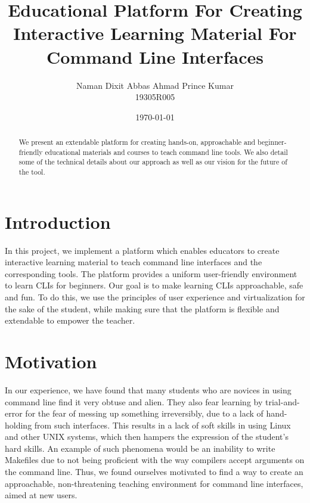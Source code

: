 \documentclass[a4paper]{article}
\begin{document}
\title{\textbf{\huge{Educational Platform For Creating Interactive Learning Material For Command Line Interfaces}}}
\author{\textbf\large{Naman Dixit \quad Abbas Ahmad \quad Prince Kumar \\ 19305R005 \quad\quad{} \quad{}}}
\date{\today}

\maketitle
\begin{abstract}
We present an extendable platform for creating hands-on, approachable and beginner-friendly  educational materials and courses to teach command line tools. We also detail some of the technical details about our approach as well as our vision for the future of the tool.

\end{abstract}
\maketitle

\section{Introduction}

In this project, we implement a platform which enables educators to create interactive learning material to teach command line interfaces and the corresponding tools. The platform provides a uniform user-friendly environment to learn CLIs for beginners. Our goal is to make learning CLIs approachable, safe and fun. To do this, we use the principles of user experience and virtualization for the sake of the student, while making sure that the platform is flexible and extendable to empower the teacher.

\section{Motivation}
In our experience, we have found that many students who are novices in using command line find it very obtuse and alien. They also fear learning by trial-and-error for the fear of messing up something irreversibly, due to a lack of hand-holding from such interfaces. This results in a lack of soft skills in using Linux and other UNIX systems, which then hampers the expression of the student's hard skills. An example of such phenomena would be an inability to write Makefiles due to not being proficient with the way compilers accept arguments on the command line. Thus, we found ourselves motivated to find a way to create an approachable, non-threatening teaching environment for command line interfaces, aimed at new users.
\end{document}
